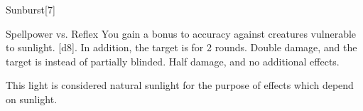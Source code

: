 \begin{spellsection}{Sunburst}[7]
    \begin{spellheader}
    \end{spellheader}
    \begin{spellcontent}
        \begin{spelltargetinginfo}
        \end{spelltargetinginfo}
        \begin{spelleffects}
            \begin{spellattack}{Spellpower vs. Reflex}
                \spellspecial You gain a  bonus to accuracy against creatures vulnerable to sunlight.
                \spellsuccess {}[d8]. In addition, the target is \partiallyblinded for 2 rounds.
                \spellcritical Double damage, and the target is \blinded instead of partially blinded.
                \spellfailure Half damage, and no additional effects.
            \end{spellattack}
        \end{spelleffects}
    \end{spellcontent}
    \begin{spellfooter}
        \spellnotes This light is considered natural sunlight for the purpose of effects which depend on sunlight.
        \miscastyou
    \end{spellfooter}
    \begin{spellaugments}
    \end{spellaugments}
\end{spellsection}

